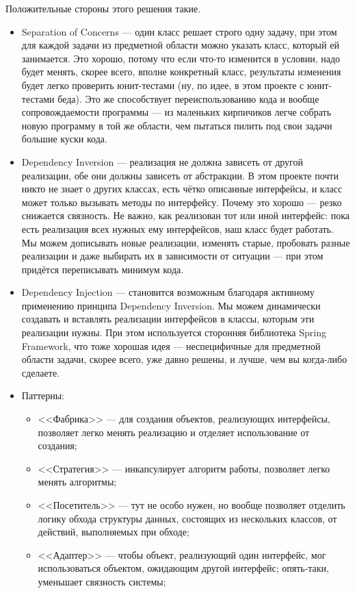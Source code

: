\documentclass[a5paper]{article}
\begin{document}
Положительные стороны этого решения такие.
\begin{itemize}
    \item Separation of Concerns --- один класс решает строго одну задачу, при этом для каждой задачи из предметной области можно указать класс, который ей занимается. Это хорошо, потому что если что-то изменится в условии, надо будет менять, скорее всего, вполне конкретный класс, результаты изменения будет легко проверить юнит-тестами (ну, по идее, в этом проекте с юнит-тестами беда). Это же способствует переиспользованию кода и вообще сопровождаемости программы --- из маленьких кирпичиков легче собрать новую программу в той же области, чем пытаться пилить под свои задачи большие куски кода.
    \item Dependency Inversion --- реализация не должна зависеть от другой реализации, обе они должны зависеть от абстракции. В этом проекте почти никто не знает о других классах, есть чётко описанные интерфейсы, и класс может только вызывать методы по интерфейсу. Почему это хорошо --- резко снижается связность. Не важно, как реализован тот или иной интерфейс: пока есть реализация всех нужных ему интерфейсов, наш класс будет работать. Мы можем дописывать новые реализации, изменять старые, пробовать разные реализации и даже выбирать их в зависимости от ситуации --- при этом придётся переписывать минимум кода.
    \item Dependency Injection --- становится возможным благодаря активному применению принципа Dependency Inversion. Мы можем динамически создавать и вставлять реализации интерфейсов в классы, которым эти реализации нужны. При этом используется сторонняя библиотека Spring Framework, что тоже хорошая идея --- неспецифичные для предметной области задачи, скорее всего, уже давно решены, и лучше, чем вы когда-либо сделаете.
    \item Паттерны:
    \begin{itemize}
        \item <<Фабрика>> --- для создания объектов, реализующих интерфейсы, позволяет легко менять реализацию и отделяет использование от создания;
        \item <<Стратегия>> --- инкапсулирует алгоритм работы, позволяет легко менять алгоритмы;
        \item <<Посетитель>> --- тут не особо нужен, но вообще позволяет отделить логику обхода структуры данных, состоящих из нескольких классов, от действий, выполняемых при обходе; 
        \item <<Адаптер>> --- чтобы объект, реализующий один интерфейс, мог использоваться объектом, ожидающим другой интерфейс; опять-таки, уменьшает связность системы;

\end{itemize}
\end{itemize}
\end{document}
